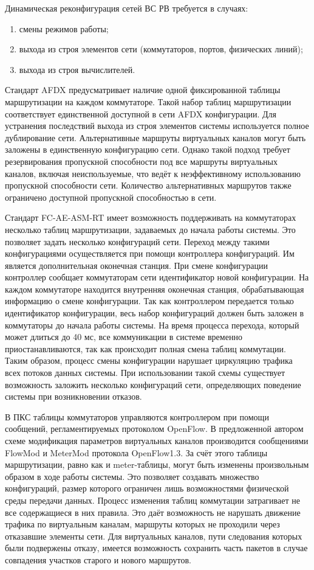 \documentclass[12pt, a4paper]{article}
\begin{document}
Динамическая реконфигурация сетей ВС РВ требуется в случаях:
\begin{enumerate}
	\item смены режимов работы;
	\item выхода из строя элементов сети (коммутаторов, портов, физических линий);
	\item выхода из строя вычислителей.
\end{enumerate}

Стандарт AFDX предусматривает наличие одной фиксированной таблицы маршрутизации на каждом коммутаторе. Такой набор таблиц маршрутизации соответствует единственной доступной в сети AFDX конфигурации. Для устранения последствий выхода из строя элементов системы используется полное дублирование сети. Альтернативные маршруты виртуальных каналов могут быть заложены в единственную конфигурацию сети. Однако такой подход требует резервирования пропускной способности под все маршруты виртуальных каналов, включая неиспользуемые, что ведёт к неэффективному использованию пропускной способности сети. Количество альтернативных маршрутов также ограничено доступной пропускной способностью в сети.

Стандарт FC-AE-ASM-RT имеет возможность поддерживать на коммутаторах несколько таблиц маршрутизации, задаваемых до начала работы системы. Это позволяет задать несколько конфигураций сети. Переход между такими конфигурациями осуществляется при помощи контроллера конфигураций. Им является дополнительная оконечная станция. При смене конфигурации контроллер сообщает коммутаторам сети идентификатор новой конфигурации. На каждом коммутаторе находится внутренняя оконечная станция, обрабатывающая информацию о смене конфигурации. Так как контроллером передается только идентификатор конфигурации, весь набор конфигураций должен быть заложен в коммутаторы до начала работы системы. На время процесса перехода, который может длиться до 40 мс, все коммуникации в системе временно приостанавливаются, так как происходит полная смена таблиц коммутации. Таким образом, процесс смены конфигурации нарушает циркуляцию трафика всех потоков данных системы. При использовании такой схемы существует возможность заложить несколько конфигураций сети, определяющих поведение системы при возникновении отказов.

В ПКС таблицы коммутаторов управляются контроллером при помощи сообщений, регламентируемых протоколом OpenFlow. В предложенной автором схеме модификация параметров виртуальных каналов производится сообщениями FlowMod и MeterMod протокола OpenFlow1.3. За счёт этого таблицы маршрутизации, равно как и meter-таблицы, могут быть изменены произвольным образом в ходе работы системы. Это позволяет создавать множество конфигураций, размер которого ограничен лишь возможностями физической среды передачи данных. Процесс изменения таблиц коммутации затрагивает не все содержащиеся в них правила. Это даёт возможность не нарушать движение трафика по виртуальным каналам, маршруты которых не проходили через отказавшие элементы сети. Для виртуальных каналов, пути следования которых были подвержены отказу, имеется возможность сохранить часть пакетов в случае совпадения участков старого и нового маршрутов. 
\end{document}
